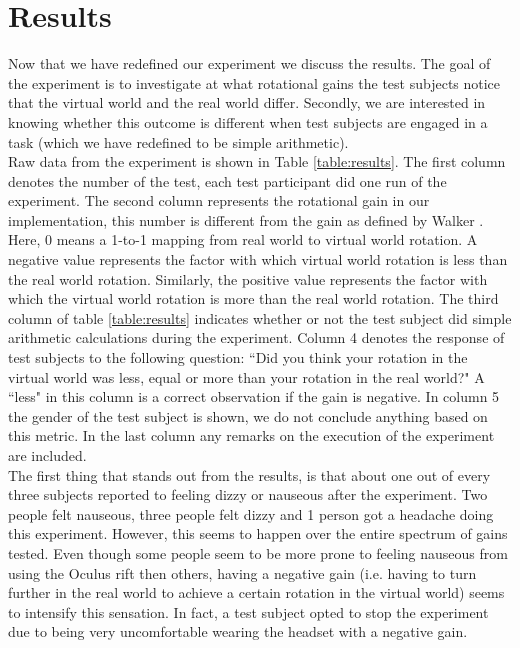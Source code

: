 \section{Results}
\begin{center}
	
\end{center}Now that we have redefined our experiment we discuss the results.
The goal of the experiment is to investigate at what rotational gains the test subjects notice that the virtual world and the real world differ.
Secondly, we are interested in knowing whether this outcome is different when test subjects are engaged in a task (which we have redefined to be simple arithmetic).\\

Raw data from the experiment is shown in Table \ref{table:results}.
The first column denotes the number of the test, each test participant did one run of the experiment.
The second column represents the rotational gain in our implementation, this number is different from the gain as defined by Walker \cite{jwalker}.
Here, 0 means a 1-to-1 mapping from real world to virtual world rotation.
A negative value represents the factor with which virtual world rotation is less than the real world rotation.
Similarly, the positive value represents the factor with which the virtual world rotation is more than the real world rotation.
The third column of table \ref{table:results} indicates whether or not the test subject did simple arithmetic calculations during the experiment.
Column 4 denotes the response of test subjects to the following question: ``Did you think your rotation in the virtual world was less, equal or more than your rotation in the real world?"
A ``less" in this column is a correct observation if the gain is negative.
In column 5 the gender of the test subject is shown, we do not conclude anything based on this metric.
In the last column any remarks on the execution of the experiment are included.\\

The first thing that stands out from the results, is that about one out of every three subjects reported to feeling dizzy or nauseous after the experiment.
Two people felt nauseous, three people felt dizzy and 1 person got a headache doing this experiment.
However, this seems to happen over the entire spectrum of gains tested.
Even though some people seem to be more prone to feeling nauseous from using the Oculus rift then others, having a negative gain (i.e. having to turn further in the real world to achieve a certain rotation in the virtual world) seems to intensify this sensation.
In fact, a test subject opted to stop the experiment due to being very uncomfortable wearing the headset with a negative gain.

